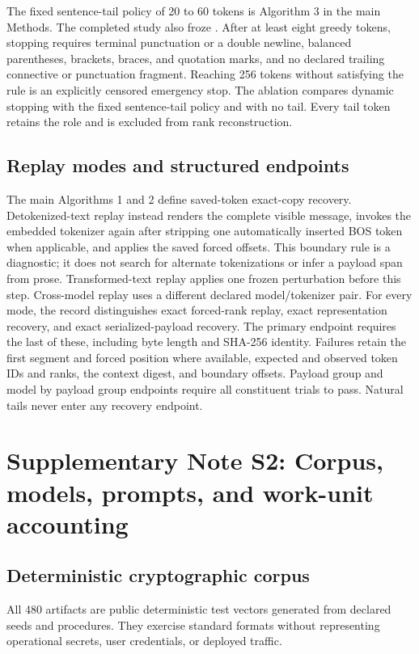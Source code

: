 \documentclass[fleqn,10pt]{wlscirep}
\DeclareRobustCommand{\code}[1]{\path{#1}}
\begin{document}
The fixed sentence-tail policy of 20 to 60 tokens is Algorithm 3 in the main Methods. The completed study also froze \code{dynamic_completion_v1}. After at least eight greedy tokens, stopping requires terminal punctuation or a double newline, balanced parentheses, brackets, braces, and quotation marks, and no declared trailing connective or punctuation fragment. Reaching 256 tokens without satisfying the rule is an explicitly censored emergency stop. The ablation compares dynamic stopping with the fixed sentence-tail policy and with no tail. Every tail token retains the role \code{tail} and is excluded from rank reconstruction.

\subsection*{Replay modes and structured endpoints}

The main Algorithms 1 and 2 define saved-token exact-copy recovery. Detokenized-text replay instead renders the complete visible message, invokes the embedded tokenizer again after stripping one automatically inserted BOS token when applicable, and applies the saved forced offsets. This boundary rule is a diagnostic; it does not search for alternate tokenizations or infer a payload span from prose. Transformed-text replay applies one frozen perturbation before this step. Cross-model replay uses a different declared model/tokenizer pair.
For every mode, the record distinguishes exact forced-rank replay, exact representation recovery, and exact serialized-payload recovery. The primary endpoint requires the last of these, including byte length and SHA-256 identity. Failures retain the first segment and forced position where available, expected and observed token IDs and ranks, the context digest, and boundary offsets. Payload group and model by payload group endpoints require all constituent trials to pass. Natural tails never enter any recovery endpoint.

\section*{Supplementary Note S2: Corpus, models, prompts, and work-unit accounting}\label{si:s2}

\subsection*{Deterministic cryptographic corpus}

All 480 artifacts are public deterministic test vectors generated from declared seeds and procedures. They exercise standard formats without representing operational secrets, user credentials, or deployed traffic.
\end{document}

